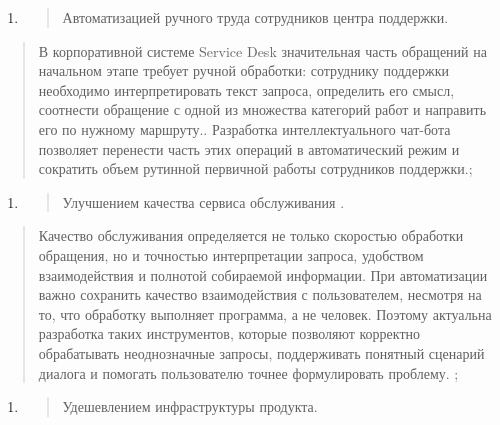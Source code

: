 \begin{enumerate}
\def\labelenumi{\arabic{enumi}.}
\item
  \begin{quote}
  Автоматизацией ручного труда сотрудников центра поддержки.
  \end{quote}
\end{enumerate}

\begin{quote}
В корпоративной системе Service Desk значительная часть обращений на
начальном этапе требует ручной обработки: сотруднику поддержки
необходимо интерпретировать текст запроса, определить его смысл,
соотнести обращение с одной из множества категорий работ и направить его
по нужному маршруту.. Разработка интеллектуального чат-бота позволяет
перенести часть этих операций в автоматический режим и сократить объем
рутинной первичной работы сотрудников поддержки.;
\end{quote}

\begin{enumerate}
\def\labelenumi{\arabic{enumi}.}
\setcounter{enumi}{1}
\item
  \begin{quote}
  Улучшением качества сервиса обслуживания .
  \end{quote}
\end{enumerate}

\begin{quote}
Качество обслуживания определяется не только скоростью обработки
обращения, но и точностью интерпретации запроса, удобством
взаимодействия и полнотой собираемой информации. При автоматизации важно
сохранить качество взаимодействия с пользователем, несмотря на то, что
обработку выполняет программа, а не человек. Поэтому актуальна
разработка таких инструментов, которые позволяют корректно обрабатывать
неоднозначные запросы, поддерживать понятный сценарий диалога и помогать
пользователю точнее формулировать проблему. ;
\end{quote}

\begin{enumerate}
\def\labelenumi{\arabic{enumi}.}
\setcounter{enumi}{2}
\item
  \begin{quote}
  Удешевлением инфраструктуры продукта.
  \end{quote}
\end{enumerate}

